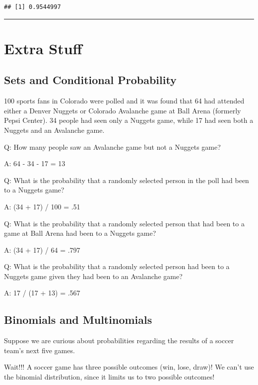\documentclass[
  11pt,
]{book}
\theoremstyle{definition}
\theoremstyle{definition}
\theoremstyle{definition}
\theoremstyle{definition}
\theoremstyle{remark}
\begin{document}
\begin{verbatim}
## [1] 0.9544997
\end{verbatim}

\begin{center}\rule{0.5\linewidth}{0.5pt}\end{center}

\hypertarget{extra-stuff}{%
\section{Extra Stuff}\label{extra-stuff}}

\hypertarget{sets-and-conditional-probability}{%
\subsection{Sets and Conditional Probability}\label{sets-and-conditional-probability}}

100 sports fans in Colorado were polled and it was found that 64 had attended either a Denver Nuggets or Colorado Avalanche game at Ball Arena (formerly Pepsi Center). 34 people had seen only a Nuggets game, while 17 had seen both a Nuggets and an Avalanche game.

Q: How many people saw an Avalanche game but not a Nuggets game?

A: 64 - 34 - 17 = 13

Q: What is the probability that a randomly selected person in the poll had been to a Nuggets game?

A: (34 + 17) / 100 = .51

Q: What is the probability that a randomly selected person that had been to a game at Ball Arena had been to a Nuggets game?

A: (34 + 17) / 64 = .797

Q: What is the probability that a randomly selected person had been to a Nuggets game given they had been to an Avalanche game?

A: 17 / (17 + 13) = .567

\hypertarget{binomials-and-multinomials}{%
\subsection{Binomials and Multinomials}\label{binomials-and-multinomials}}

Suppose we are curious about probabilities regarding the results of a soccer team's next five games.

Wait!!! A soccer game has three possible outcomes (win, lose, draw)! We can't use the binomial distribution, since it limits us to two possible outcomes!
\end{document}
